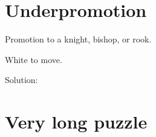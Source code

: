 \documentclass{book}
\begin{document}
\section{Underpromotion}
Promotion to a knight, bishop, or rook.\begin{multicols}{2} 
\begin{samepage} 
\newgame 


 
\showboard
 
 White to move. 
 
Solution: 
 
\end{samepage}\end{multicols} 
\newpage 
\section{Very long puzzle}
\end{document}
